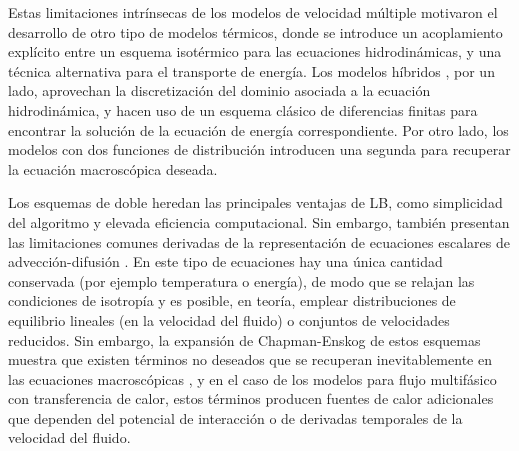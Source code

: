 Estas limitaciones intr\'insecas de los modelos de velocidad m\'ultiple motivaron el desarrollo de otro tipo de modelos t\'ermicos, donde se introduce un acoplamiento expl\'icito entre un esquema isot\'ermico para las ecuaciones hidrodin\'amicas, y una t\'ecnica alternativa para el transporte de energ\'ia. Los modelos h\'ibridos \cite{dong_numerical_2012,li_lattice_2015}, por un lado, aprovechan la discretizaci\'on del dominio asociada a la ecuaci\'on hidrodin\'amica, y hacen uso de un esquema cl\'asico de diferencias finitas para encontrar la soluci\'on de la ecuaci\'on de energ\'ia correspondiente. Por otro lado, los modelos con dos funciones de distribuci\'on introducen una segunda \lbe{} para recuperar la ecuaci\'on macrosc\'opica deseada.

Los esquemas de doble \fdp{} heredan las principales ventajas de LB, como simplicidad del algoritmo y elevada eficiencia computacional. Sin embargo, tambi\'en presentan las limitaciones comunes derivadas de la representaci\'on de ecuaciones escalares de advecci\'on-difusi\'on \cite{huang_multiphase_2015, markus_simulation_2011, huang_modified_2014, li_improved_2017, huang_numerical_2011, li_effect_2014}. En este tipo de ecuaciones hay una \'unica cantidad conservada (por ejemplo temperatura o energ\'ia), de modo que se relajan las condiciones de isotrop\'ia y es posible, en teor\'ia, emplear distribuciones de equilibrio lineales (en la velocidad del fluido) o conjuntos de velocidades reducidos. Sin embargo, la expansi\'on de Chapman-Enskog de estos esquemas muestra que existen t\'erminos no deseados que se recuperan inevitablemente en las ecuaciones macrosc\'opicas \cite{kruger_lattice_2017, huang_modified_2014, huang_numerical_2011}, y en el caso de los modelos para flujo multif\'asico con transferencia de calor, estos t\'erminos producen fuentes de calor adicionales que dependen del potencial de interacci\'on o de derivadas temporales de la velocidad del fluido.

